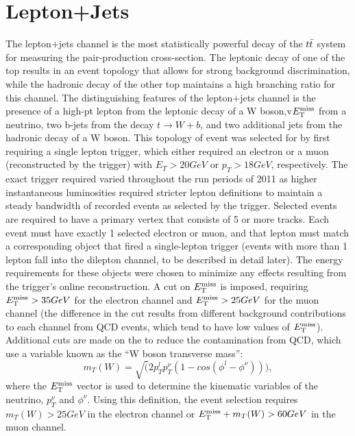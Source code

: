
\section{Lepton+Jets}

The lepton$+$jets channel is the most statistically powerful decay of the $t\bar{t}$ system for measuring the pair-production cross-section.
The leptonic decay of one of the top results in an event topology that allows for strong background discrimination, while the hadronic decay of the other top maintains a high branching ratio for this channel.
The distinguishing features of the lepton$+$jets channel is the presence of a high-pt lepton from the leptonic decay of a W boson,v$E_{\mathrm{T}}^{\mathrm{miss}}$ from a neutrino, two b-jets from the decay $t \rightarrow W+b$, and two additional jets from the hadronic decay of a W boson.
This topology of event was selected for by first requiring a single lepton trigger, which either required an electron or a muon (reconstructed by the trigger) with $E_{T} > 20 GeV$ or $p_{T} > 18 GeV$, respectively.
The exact trigger required varied throughout the run periods of 2011 as higher instantaneous luminosities required stricter lepton definitions to maintain a steady bandwidth of recorded events as selected by the trigger.
Selected events are required to have a primary vertex that consists of 5 or more tracks.
Each event must have exactly 1 selected electron or muon, and that lepton must match a corresponding object that fired a single-lepton trigger (events with more than 1 lepton fall into the dilepton channel, to be described in detail later).
The energy requirements for these objects were chosen to minimize any effects resulting from the trigger's online reconstruction.
A cut on $E_{\mathrm{T}}^{\mathrm{miss}}$ is imposed, requiring $E_{\mathrm{T}}^{\mathrm{miss}} > 35 GeV$ for the electron channel and $E_{\mathrm{T}}^{\mathrm{miss}} > 25 GeV$ for the muon channel (the difference in the cut results from different background contributions to each channel from QCD events, which tend to have low values of $E_{\mathrm{T}}^{\mathrm{miss}}$).
Additional cuts are made on the to reduce the contamination from QCD, which use a variable known as the ``W boson transverse mass'':
\begin{equation}
  m_{T}(W) = \sqrt(2 p_{T}^{l} p_{T}^{\nu} (1 - cos( \phi^{l} - \phi^{\nu}))),
\end{equation} 
where the $E_{\mathrm{T}}^{\mathrm{miss}}$ vector is used to determine the kinematic variables of the neutrino, $p_{T}^{\nu}$ and $\phi^{\nu}$.
Using this definition, the event selection requires $m_{T}(W) > 25 GeV$ in the electron channel or $E_{\mathrm{T}}^{\mathrm{miss}} + m_{T}(W) > 60 GeV$ in the muon channel.

